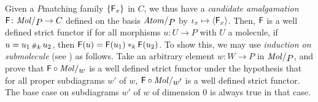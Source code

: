 \begin{comm} \label{comm:well_defined_amalgamation}
    Given a \( P \)\nbd matching family \( \left\{ {\mathsf{F}_x} \right\} \) in \( C \), we thus have a \emph{candidate amalgamation} \( \F \colon \molecin{P} \to C \) defined on the basis \( \atomin{P} \) by \( \iota_{x} \mapsto \langle\mathsf{F}_x\rangle \).
    Then, \( \mathsf{F} \) is a well defined strict functor if for all morphisms \( u \colon U \to P \) with \( U \) a molecule, if \( u = u_1 \,{\scriptstyle\#}_{k}\, u_2 \), then \( \mathsf{F}(u) = \mathsf{F}(u_1) *_{k} \mathsf{F}(u_2) \).
    To show this, we may use \emph{induction on submolecule} (see \cite[Comment 4.1.7]{hadzihasanovic2024combinatorics}) as follows.
    Take an arbitrary element \( w \colon W \to P \) in \( \molecin{P} \), and prove that \( \F \after \molecin{w} \) is a well defined strict functor under the hypothesis that for all proper subdiagrams \( w' \) of \( w \), \( \F \after \molecin{w'} \) is a well defined strict functor.
    The base case on subdiagrams \( w' \) of \( w \) of dimension \( 0 \) is always true in that case. 
\end{comm}

